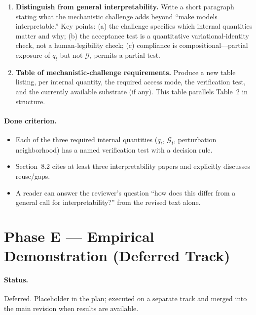 \documentclass[11pt]{article}
\begin{document}
\begin{enumerate}[leftmargin=*]
\begin{itemize}[leftmargin=*]
\end{itemize}
Explain which of these, if any, could be reused as a substrate for exposing $q_t$, and which fall short.
\item \textbf{Distinguish from general interpretability.} Write a short paragraph stating what the mechanistic challenge adds beyond ``make models interpretable.'' Key points: (a) the challenge specifies which internal quantities matter and why; (b) the acceptance test is a quantitative variational-identity check, not a human-legibility check; (c) compliance is compositional---partial exposure of $q_t$ but not $\mathcal{G}_t$ permits a partial test.
\item \textbf{Table of mechanistic-challenge requirements.} Produce a new table listing, per internal quantity, the required access mode, the verification test, and the currently available substrate (if any). This table parallels Table~2 in structure.
\end{enumerate}

\paragraph{Done criterion.}
\begin{itemize}[leftmargin=*]
\item Each of the three required internal quantities ($q_t$, $\mathcal{G}_t$, perturbation neighborhood) has a named verification test with a decision rule.
\item Section~8.2 cites at least three interpretability papers and explicitly discusses reuse/gaps.
\item A reader can answer the reviewer's question ``how does this differ from a general call for interpretability?'' from the revised text alone.
\end{itemize}

\section{Phase E --- Empirical Demonstration (Deferred Track)}
\label{sec:phaseE}

\paragraph{Status.} Deferred. Placeholder in the plan; executed on a separate track and merged into the main revision when results are available.
\end{document}
